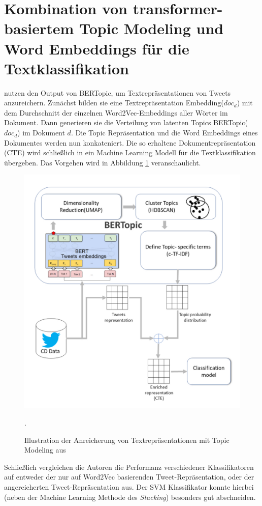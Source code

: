 \documentclass[ngerman]{ttlab-qualify}
\begin{document}
\section{Kombination von transformer-basiertem Topic Modeling und Word Embeddings für die Textklassifikation}
\textcite{alhaj2022improving} nutzen den Output von BERTopic, um Textrepräsentationen von Tweets anzureichern. Zunächst bilden sie eine Textrepräsentation Embedding($doc_d$) mit dem Durchschnitt der einzelnen Word2Vec-Embeddings aller Wörter im Dokument. Dann generieren sie die Verteilung von latenten Topics BERTopic($doc_d$) im Dokument $d$. Die Topic Repräsentation und die Word Embeddings eines Dokumentes werden nun konkateniert. Die so erhaltene Dokumentrepräsentation (CTE) wird schließlich in ein Machine Learning Modell für die Textklassifikation übergeben. Das Vorgehen wird in Abbildung \ref{BERTopic_Word2Vec_TC} veranschaulicht.
\begin{figure}[H]
\begin{center}
\includegraphics[width=12cm]{grafiken/BERTopic_Word2Vec_TC.jpeg}
\caption[Illustration der Anreicherung von Textrepräsentationen mit Topic Modeling]{Illustration der Anreicherung von Textrepräsentationen mit Topic Modeling aus \textcite[4]{alhaj2022improving}}.
\label{BERTopic_Word2Vec_TC}
\end{center}
\end{figure} 
\noindent Schließlich vergleichen die Autoren die Performanz verschiedener Klassifikatoren auf entweder der nur auf Word2Vec basierenden Tweet-Repräsentation, oder der angereicherten Tweet-Repräsentation aus. Der SVM Klassifikator konnte hierbei (neben der Machine Learning Methode des \textit{Stacking}) besonders gut abschneiden.
\end{document}
